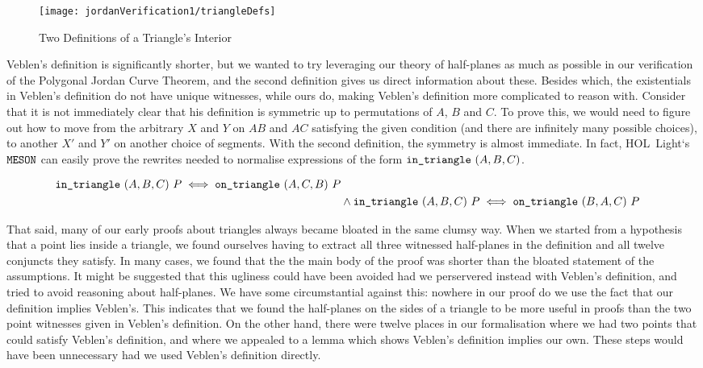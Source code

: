 \begin{figure}
\centering\texttt{[image: jordanVerification1/triangleDefs]}
\caption{Two Definitions of a Triangle's Interior}
\label{fig:triangleDefs}
\end{figure}

Veblen's definition is significantly shorter, but we wanted to try leveraging our theory of half-planes as much as possible in our verification of the Polygonal Jordan Curve Theorem, and the second definition gives us direct information about these. Besides which, the existentials in Veblen's definition do not have unique witnesses, while ours do, making Veblen's definition more complicated to reason with. Consider that it is not immediately clear that his definition is symmetric up to permutations of $A$, $B$ and $C$. To prove this, we would need to figure out how to move from the arbitrary $X$ and $Y$ on $AB$ and $AC$ satisfying the given condition (and there are infinitely many possible choices), to another $X'$ and $Y'$ on another choice of segments. With the second definition, the symmetry is almost immediate. In fact, HOL~Light`s $\texttt{MESON}$ can easily prove the rewrites needed to normalise expressions of the form $\texttt{in\_triangle}\ (A,B,C)$. 

\begin{equation}\label{eq:triSyms}
  \begin{split}
    \code{in\_triangle}\ (A,B,C)\ P \iff \code{on\_triangle}\ (A,C,B)\ P\\
&    \wedge \code{in\_triangle}\ (A,B,C)\ P \iff \code{on\_triangle}\ (B,A,C)\ P\\
  \end{split}
\end{equation}

That said, many of our early proofs about triangles always became bloated in the same clumsy way. When we started from a hypothesis that a point lies inside a triangle, we found ourselves having to extract all three witnessed half-planes in the definition and all twelve conjuncts they satisfy. In many cases, we found that the the main body of the proof was shorter than the bloated statement of the assumptions. It might be suggested that this ugliness could have been avoided had we perservered instead with Veblen's definition, and tried to avoid reasoning about half-planes. We have some circumstantial against this: nowhere in our proof do we use the fact that our definition implies Veblen's. This indicates that we found the half-planes on the sides of a triangle to be more useful in proofs than the two point witnesses given in Veblen's definition. On the other hand, there were twelve places in our formalisation where we had two points that could satisfy Veblen's definition, and where we appealed to a lemma which shows Veblen's definition implies our own. These steps would have been unnecessary had we used Veblen's definition directly. 

